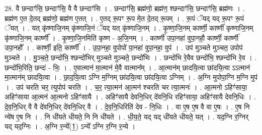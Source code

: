 \documentclass[17pt]{extarticle}
\begin{document}
28. वै छन्दाꣳ॑सि॒ छन्दाꣳ॑सि॒ वै वै छन्दाꣳ॑सि । . छन्दाꣳ॑सि॒ ब्रह्म॑णो॒ ब्रह्म॑ण॒ श्छन्दाꣳ॑सि॒ छन्दाꣳ॑सि॒ ब्रह्म॑णः । . ब्रह्म॑ण ए॒त दे॒तद् ब्रह्म॑णो॒ ब्रह्म॑ण ए॒तत् । . ए॒तद् रू॒पꣳ रू॒प मे॒त दे॒तद् रू॒पम् । . रू॒पं ॅयद् यद् रू॒पꣳ रू॒पं ॅयत् । . यत् कृ॑ष्णाजि॒नम् कृ॑ष्णाजि॒नं ॅयद् यत् कृ॑ष्णाजि॒नम् । . कृ॒ष्णा॒जि॒नम् कार्ष्णी॒ कार्ष्णी॑ कृष्णाजि॒नम् कृ॑ष्णाजि॒नम् कार्ष्णी᳚ । . कृ॒ष्णा॒जि॒नमिति॑ कृष्ण - अ॒जि॒नम् । . कार्ष्णी॑ उपा॒नहा॑ वुपा॒नहौ॒ कार्ष्णी॒ कार्ष्णी॑ उपा॒नहौ᳚ । . कार्ष्णी॒ इति॒ कार्ष्णी᳚ । . उ॒पा॒नहा॒ वुपोपो॑ पा॒नहा॑ वुपा॒नहा॒ वुप॑ । . उप॑ मुञ्चते मुञ्चत॒ उपोप॑ मुञ्चते । . मु॒ञ्च॒ते॒ छन्दो॑भि॒ श्छन्दो॑भिर् मुञ्चते मुञ्चते॒ छन्दो॑भिः । . छन्दो॑भि रे॒वैव छन्दो॑भि॒ श्छन्दो॑भि रे॒व । . छन्दो॑भि॒रिति॒ छन्दः॑ - भिः॒ । . ए॒वात्मान॑ मा॒त्मान॑ मे॒वै वात्मान᳚म् । . आ॒त्मान॑म् छादयि॒त्वा छा॑दयि॒त्वा ऽऽत्मान॑ मा॒त्मान॑म् छादयि॒त्वा । . छा॒द॒यि॒त्वा ऽग्नि म॒ग्निम् छा॑दयि॒त्वा छा॑दयि॒त्वा ऽग्निम् । . अ॒ग्नि मुपोपा॒ग्नि म॒ग्नि मुप॑ । . उप॑ चरति चर॒ त्युपोप॑ चरति । . च॒र॒ त्या॒त्मन॑ आ॒त्मन॑ श्चरति चर त्या॒त्मनः॑ । . आ॒त्मनो ऽहिꣳ॑साया॒ अहिꣳ॑साया आ॒त्मन॑ आ॒त्मनो ऽहिꣳ॑सायै । . अहिꣳ॑सायै देवनि॒धिर् दे॑वनि॒धि रहिꣳ॑साया॒ अहिꣳ॑सायै देवनि॒धिः । . दे॒व॒नि॒धिर् वै वै दे॑वनि॒धिर् दे॑वनि॒धिर् वै । . दे॒व॒नि॒धिरिति॑ देव - नि॒धिः । . वा ए॒ष ए॒ष वै वा ए॒षः । . ए॒ष नि न्ये॑ष ए॒ष नि । . नि धी॑यते धीयते॒ नि नि धी॑यते । . धी॒य॒ते॒ यद् यद् धी॑यते धीयते॒ यत् । . यद॒ग्नि र॒ग्निर् यद् यद॒ग्निः । . अ॒ग्नि र॒न्ये᳚(1॒) ऽन्ये᳚ ऽग्नि र॒ग्नि र॒न्ये । \newline
\end{document}
